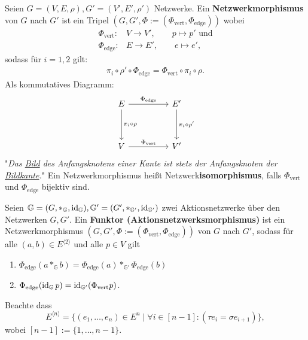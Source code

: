 \begin{definition}
    Seien $G = (V,E, \rho), G'= (V', E', \rho')$ Netzwerke.
    Ein \textbf{Netzwerkmorphismus} von $G$ nach $G'$ ist ein Tripel $(G, G', \Phi := (\Phi_{\text{vert}}, \Phi_{\text{edge}}))$  wobei
    \begin{align*}
        \Phi_{\text{vert}}:& V \to V',\qquad p \mapsto p' \text{ und}\\
        \Phi_{\text{edge}}:& E \to E',\qquad e \mapsto e',
    \end{align*}
    sodass für $i=1,2$ gilt:
    \begin{align*}
        \pi_i \circ \rho' \circ \Phi_{\text{edge}} = \Phi_{\text{vert}} \circ \pi_i \circ \rho.
    \end{align*}
    Als kommutatives Diagramm:
    $$\begin{tikzcd}[column sep=huge, row sep=huge]
        E \dar{\pi_i \circ \rho} \rar{\Phi_{\text{edge}}} & E' \dar{\pi_i \circ \rho'}\\
        V \rar{\Phi_{\text{vert}}} & V' 
    \end{tikzcd}$$
    "\textit{Das \underline{Bild} des Anfangsknotens einer Kante ist stets der Anfangsknoten der \underline{Bildkante}.}"\nl
    Ein Netzwerkmorphismus heißt Netzwerk\textbf{isomorphismus}, falls $\Phi_{\text{vert}}$ und $\Phi_{\text{edge}}$ bijektiv sind.
\end{definition}

\begin{definition}
    Seien $\mathbb{G} = (G, \ast_\mathbb{G}, \operatorname{id}_\mathbb{G}), \mathbb{G}' = (G', \ast_{\mathbb{G}'}, \operatorname{id}_{\mathbb{G}'})$
    zwei Aktionsnetzwerke über den Netzwerken $G,G'$.
    Ein \textbf{Funktor (Aktionsnetzwerksmorphismus)} ist ein Netzwerkmorphismus $(G, G', \Phi := (\Phi_{\text{vert}}, \Phi_{\text{edge}}))$ von $G$ nach $G'$, 
    sodass für alle $(a,b) \in E^{\langle 2 \rangle}$ und alle $p \in V$ gilt
    \begin{enumerate}[label=(M\arabic*)]
        \item $\Phi_{\text{edge}}(a \ast_{\mathbb{G}} b) = \Phi_{\text{edge}}(a) \ast_{\mathbb{G}'} \Phi_{\text{edge}}(b)$
        \item $\Phi_{\text{edge}}(\operatorname{id}_\mathbb{G} p) = \operatorname{id}_{\mathbb{G}'}(\Phi_{\text{vert}} p)$.
    \end{enumerate}
    Beachte dass
    $$ E^{\langle n \rangle} = \{(e_1,\ldots,e_n) \in E^n \mid \forall i \in [n-1]: ( \tau e_i = \sigma e_{i+1})\}, $$
    wobei $[n-1] := \{1, \ldots, n-1\}$.
\end{definition}

